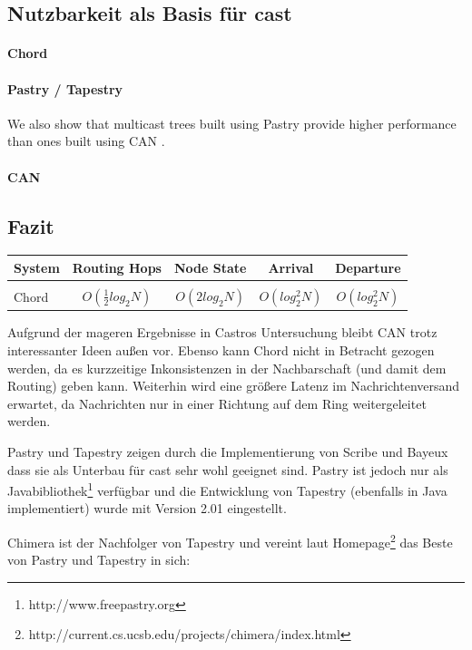 \subsection{Nutzbarkeit als Basis für \ac{cast}}
\paragraph{Chord}

\paragraph{Pastry / Tapestry}
We also show that multicast trees built using Pastry provide higher performance than ones built using CAN \cite{Castro2003Evaluation, KostasKatrinis2005}.

\paragraph{CAN}
\cite{Ratnasamy2001}

\subsection{Fazit}

\begin{tabular}{l|c|c|c|c} \\
System & Routing Hops & Node State & Arrival & Departure\\ \hline \\
Chord & $O(\frac{1}{2}log_2 N)$ & $O(2log_2 N) $ & $ O(log_2^2 N) $ & $ O(log_2^2 N) $
\label{tab:evaluation_p2p}
\end{tabular}

Aufgrund der mageren Ergebnisse in Castros Untersuchung \cite{Castro2003Evaluation} bleibt CAN trotz interessanter Ideen außen vor. Ebenso kann Chord nicht in Betracht gezogen werden, da es kurzzeitige Inkonsistenzen in der Nachbarschaft (und damit dem Routing) geben kann. Weiterhin wird eine größere Latenz im Nachrichtenversand erwartet, da Nachrichten nur in einer Richtung auf dem Ring weitergeleitet werden.

Pastry und Tapestry zeigen durch die Implementierung von Scribe und Bayeux \cite{Castro2002Scribe, Zhuang2001} dass sie als Unterbau für \ac{cast} sehr wohl geeignet sind. Pastry ist jedoch nur als Javabibliothek\footnote{http://www.freepastry.org} verfügbar und die Entwicklung von Tapestry (ebenfalls in Java implementiert) wurde mit Version 2.01 eingestellt.

Chimera ist der Nachfolger von Tapestry und vereint laut Homepage\footnote{http://current.cs.ucsb.edu/projects/chimera/index.html} das Beste von Pastry und Tapestry in sich: 

